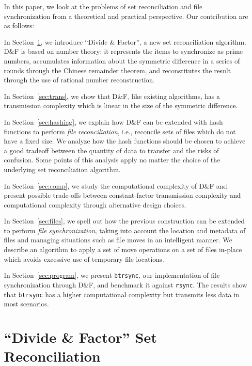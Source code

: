 \documentclass{llncs}
\newcommand{\df}{D\&F\xspace}
\newcommand{\btrsync}{\texttt{btrsync}\xspace}
\newcommand{\rsync}{\texttt{rsync}\xspace}
\begin{document}
In this paper, we look at the problems of set reconciliation and file
synchronization from a theoretical and practical perspective. Our contribution
are as follows:
\begin{compactitem}
  \item In Section~\ref{sec:dandf}, we introduce ``Divide \& Factor'', a new set
    reconciliation algorithm. \df is based on number theory: it represents the
    items to synchronize as prime numbers, accumulates information about the
    symmetric difference in a series of rounds through the Chinese remainder
    theorem, and reconstitutes the result through the use of rational number
    reconstruction.
  \item In Section~\ref{sec:trans}, we show that \df, like existing algorithms,
    has a transmission complexity which is linear in the size of the symmetric
    difference.%
  \item In Section~\ref{sec:hashing}, we explain how \df can be extended with
    hash functions to perform \emph{file reconciliation}, i.e., reconcile sets
    of files which do not have a fixed size. We analyze how the hash functions
    should be chosen to achieve a good tradeoff between the quantity of data to
    transfer and the risks of confusion. Some points of this analysis apply no
    matter the choice of the underlying set reconciliation algorithm.
  \item In Section~\ref{sec:comp}, we study the computational complexity of \df
    and present possible trade-offs between constant-factor transmission
    complexity and computational complexity through alternative design choices.
  \item In Section~\ref{sec:files}, we spell out how the previous construction
    can be extended to perform \emph{file synchronization}, taking into account
    the location and metadata of files and managing situations such as file
    moves in an intelligent manner. We describe an algorithm to apply a set of
    move operations on a set of files in-place which avoids excessive use of
    temporary file locations.
  \item In Section~\ref{sec:program}, we present \btrsync, our implementation
    of file synchronization through \df, and benchmark it against \rsync. The
    results show that \btrsync has a higher computational complexity but
    transmits less data in most scenarios.
\end{compactitem}

\section{``Divide \& Factor'' Set Reconciliation}
\label{sec:dandf}
\end{document}
